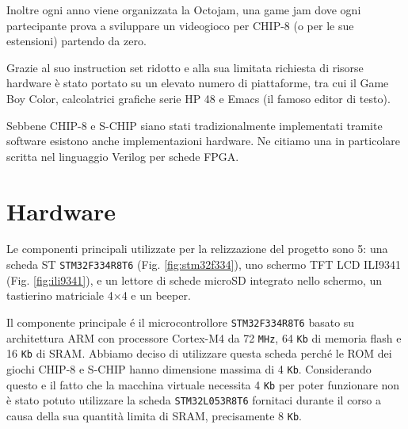 \documentclass[a4paper]{article}
\begin{document}
Inoltre ogni anno viene organizzata la Octojam, una game jam dove ogni partecipante prova a sviluppare un videogioco per CHIP-8 (o per le sue estensioni) partendo da zero.

Grazie al suo instruction set ridotto e alla sua limitata richiesta di risorse hardware è stato portato su un elevato numero di piattaforme, tra cui il Game Boy Color, calcolatrici grafiche serie HP 48 e Emacs (il famoso editor di testo).

Sebbene CHIP-8 e S-CHIP siano stati tradizionalmente implementati tramite software esistono anche implementazioni hardware. Ne citiamo una in particolare scritta nel linguaggio Verilog per schede FPGA.

\section{Hardware}\label{sec:hardware}

Le componenti principali utilizzate per la relizzazione del progetto sono 5:
una scheda ST \texttt{STM32F334R8T6} (Fig. \ref{fig:stm32f334}), uno schermo
TFT LCD ILI9341 (Fig. \ref{fig:ili9341}), e un lettore di schede microSD
integrato nello schermo, un tastierino matriciale 4$\times$4 e un beeper.

Il componente principale é il microcontrollore \texttt{STM32F334R8T6} basato su
architettura ARM con processore Cortex-M4 da 72 \texttt{MHz}, 64 \texttt{Kb} di
memoria flash e 16 \texttt{Kb} di SRAM. Abbiamo deciso di utilizzare questa
scheda perché le ROM dei giochi CHIP-8 e S-CHIP hanno dimensione massima di 4
\texttt{Kb}. Considerando questo e il fatto che la macchina virtuale necessita
4 \texttt{Kb} per poter funzionare non è stato potuto utilizzare la scheda
\texttt{STM32L053R8T6} fornitaci durante il corso a causa della sua quantità
limita di SRAM, precisamente 8 \texttt{Kb}.
\end{document}
